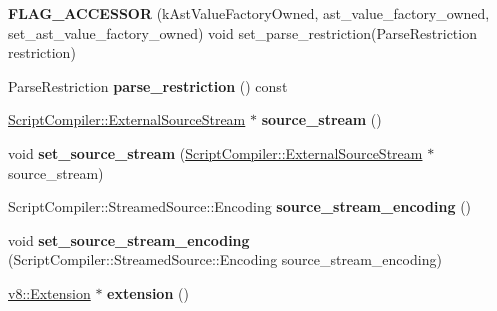 \begin{DoxyCompactItemize}
\item 
{\bfseries F\+L\+A\+G\+\_\+\+A\+C\+C\+E\+S\+S\+OR} (k\+Ast\+Value\+Factory\+Owned, ast\+\_\+value\+\_\+factory\+\_\+owned, set\+\_\+ast\+\_\+value\+\_\+factory\+\_\+owned) void set\+\_\+parse\+\_\+restriction(Parse\+Restriction restriction)\hypertarget{classv8_1_1internal_1_1_parse_info_aa514612e8e84ef6eaffe0501ea26ca6a}{}\label{classv8_1_1internal_1_1_parse_info_aa514612e8e84ef6eaffe0501ea26ca6a}

\item 
Parse\+Restriction {\bfseries parse\+\_\+restriction} () const \hypertarget{classv8_1_1internal_1_1_parse_info_acb7f7718b69ddadd33554df9b9254eb4}{}\label{classv8_1_1internal_1_1_parse_info_acb7f7718b69ddadd33554df9b9254eb4}

\item 
\hyperlink{classv8_1_1_script_compiler_1_1_external_source_stream}{Script\+Compiler\+::\+External\+Source\+Stream} $\ast$ {\bfseries source\+\_\+stream} ()\hypertarget{classv8_1_1internal_1_1_parse_info_a5baeb3cd492a04c4a6f5d5325d94bb00}{}\label{classv8_1_1internal_1_1_parse_info_a5baeb3cd492a04c4a6f5d5325d94bb00}

\item 
void {\bfseries set\+\_\+source\+\_\+stream} (\hyperlink{classv8_1_1_script_compiler_1_1_external_source_stream}{Script\+Compiler\+::\+External\+Source\+Stream} $\ast$source\+\_\+stream)\hypertarget{classv8_1_1internal_1_1_parse_info_a5363d5c3cfe507f2f0d5a4e9ab18190d}{}\label{classv8_1_1internal_1_1_parse_info_a5363d5c3cfe507f2f0d5a4e9ab18190d}

\item 
Script\+Compiler\+::\+Streamed\+Source\+::\+Encoding {\bfseries source\+\_\+stream\+\_\+encoding} ()\hypertarget{classv8_1_1internal_1_1_parse_info_af478b0331821211457a6097909fc7f40}{}\label{classv8_1_1internal_1_1_parse_info_af478b0331821211457a6097909fc7f40}

\item 
void {\bfseries set\+\_\+source\+\_\+stream\+\_\+encoding} (Script\+Compiler\+::\+Streamed\+Source\+::\+Encoding source\+\_\+stream\+\_\+encoding)\hypertarget{classv8_1_1internal_1_1_parse_info_a724b9668d81b9f9ef84fd5867e5f9913}{}\label{classv8_1_1internal_1_1_parse_info_a724b9668d81b9f9ef84fd5867e5f9913}

\item 
\hyperlink{classv8_1_1_extension}{v8\+::\+Extension} $\ast$ {\bfseries extension} ()\hypertarget{classv8_1_1internal_1_1_parse_info_a7f07df3eeb75eee300938679081d6bae}{}\label{classv8_1_1internal_1_1_parse_info_a7f07df3eeb75eee300938679081d6bae}


\end{DoxyCompactItemize}
